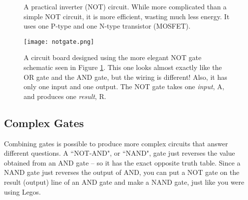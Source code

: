 \begin{figure}[h!]
\begin{center}


\caption{A practical inverter (NOT) circuit. While more complicated than a simple NOT circuit, it is more efficient, wasting much less energy. It uses one P-type and one N-type transistor (MOSFET).}
\label{fig:cmosnot}
\end{center}
\end{figure}


\begin{figure}[h!]
\begin{center}
\texttt{[image: notgate.png]}
\caption{A circuit board designed using the more elegant NOT gate schematic seen in Figure \ref{fig:cmosnot}. This one looks almost exactly like the OR gate and the AND gate, but the wiring is different! Also, it has only one input and one output. The NOT gate takes one \emph{input}, A, and produces one \emph{result}, R.}
\label{fig:notgateboard}
\end{center}
\end{figure}

\begin{table}

\caption{The list of components needed to solder up the NOT gate seen in Figures \ref{fig:cmosnot} and \ref{fig:notgateboard}.}

\end{table}

\clearpage
\newpage

\subsection*{Complex Gates}

Combining gates is possible to produce more complex circuits that answer different questions. A ``NOT-AND", or ``NAND", gate just reverses the value obtained from an AND gate -- so it has the exact opposite truth table. Since a NAND gate just reverses the output of AND, you can put a NOT gate on the result (output) line of an AND gate and make a NAND gate, just like you were using Legos.


